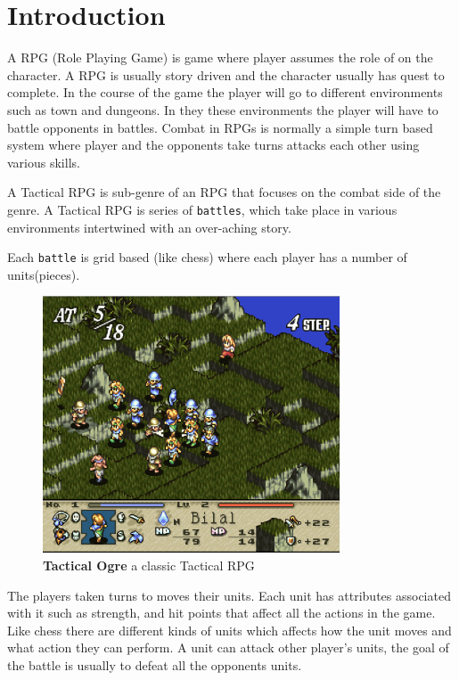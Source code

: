  
\renewcommand{\theTitle}{A Tactical RPG Engine}
\renewcommand{\theAuthor}{\fullName}

 
\maketitle

\section{Introduction} \label{introduction}

A RPG (Role Playing Game) is game where player assumes the role of on the character. A RPG is usually story driven and the character usually has quest to complete. In the course of the game the player will go to different environments such as town and dungeons. In they these environments the player will have to battle opponents in battles. Combat in RPGs is normally a simple turn based system where player and the opponents take turns attacks each other using various skills. 

A Tactical RPG is sub-genre of an RPG that focuses on the combat side of the genre. A Tactical RPG is series of \texttt{battles}, which take place in various environments intertwined with an over-aching story.

Each \texttt{battle} is grid based (like chess) where each player has a number of units(pieces). 
\begin{figure}
	[htbp] \centering 
	\includegraphics[height=3in]{figures/TRPG.png} \caption{\textbf{Tactical Ogre}\cite{to} a classic Tactical RPG } \label{fig:figures_TRPG} 
\end{figure}
The players taken turns to moves their units. Each unit has attributes associated with it such as strength, and hit points that affect all the actions in the game. Like chess there are different kinds of units which affects how the unit moves and what action they can perform. A unit can attack other player's units, the goal of the battle is usually to defeat all the opponents units.

